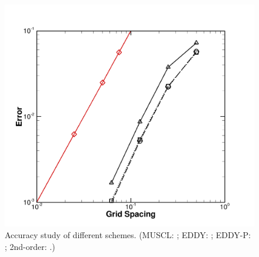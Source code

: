 \begin{figure}[t]  
\centering
     \includegraphics[clip=true, trim= 1.5cm 1.25cm 0.5cm 0.5cm,width=0.99\linewidth]{./figures/vortex3d/order}                            
     \caption{Accuracy study of different schemes. (MUSCL: \mline; EDDY: \eline; EDDY-P: \epline; 2nd-order: \exact.)}
     \label{order}   
\end{figure}














